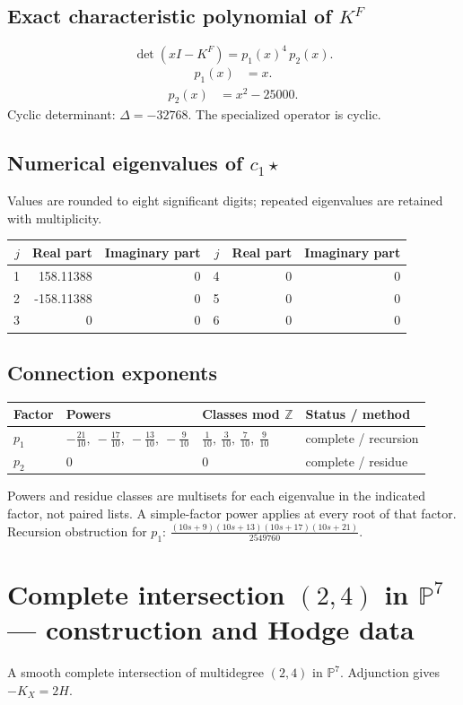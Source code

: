 \documentclass[10pt,a4paper]{article}
\begin{document}
\subsection*{Exact characteristic polynomial of $K^F$}
\[\det(xI-K^F)=p_{1}(x)^{4}\,p_{2}(x).\]
\[\begin{aligned}p_{1}(x)&=x.\end{aligned}\]
\[\begin{aligned}p_{2}(x)&=x^{2} - 25000.\end{aligned}\]
Cyclic determinant: $\Delta=-32768$. The specialized operator is cyclic.
\subsection*{Numerical eigenvalues of $c_1\star$}
Values are rounded to eight significant digits; repeated eigenvalues are retained with multiplicity.
\begin{center}\small\begin{tabular}{rrr@{\qquad}rrr}\toprule $j$ & Real part & Imaginary part & $j$ & Real part & Imaginary part\\\midrule
1 & 158.11388 & 0 & 4 & 0 & 0\\
2 & -158.11388 & 0 & 5 & 0 & 0\\
3 & 0 & 0 & 6 & 0 & 0\\
\bottomrule\end{tabular}\end{center}
\subsection*{Connection exponents}
\begin{center}\begin{tabular}{llll}\toprule Factor & Powers & Classes mod $\mathbb Z$ & Status / method\\\midrule
$p_{1}$ & $- \frac{21}{10},\ - \frac{17}{10},\ - \frac{13}{10},\ - \frac{9}{10}$ & $\frac{1}{10},\ \frac{3}{10},\ \frac{7}{10},\ \frac{9}{10}$ & complete / recursion\\
$p_{2}$ & $0$ & $0$ & complete / residue\\
\bottomrule\end{tabular}\end{center}
Powers and residue classes are multisets for each eigenvalue in the indicated factor, not paired lists. A simple-factor power applies at every root of that factor.
Recursion obstruction for $p_{1}$: $\frac{\left(10 s + 9\right) \left(10 s + 13\right) \left(10 s + 17\right) \left(10 s + 21\right)}{2549760}$.
\clearpage\section*{Complete intersection $(2,4)$ in $\mathbb P^{7}$ --- construction and Hodge data}\label{entry:PCI5-2-4}
A smooth complete intersection of multidegree $(2,4)$ in $\mathbb P^{7}$.
Adjunction gives $-K_X=2H$.
\end{document}
